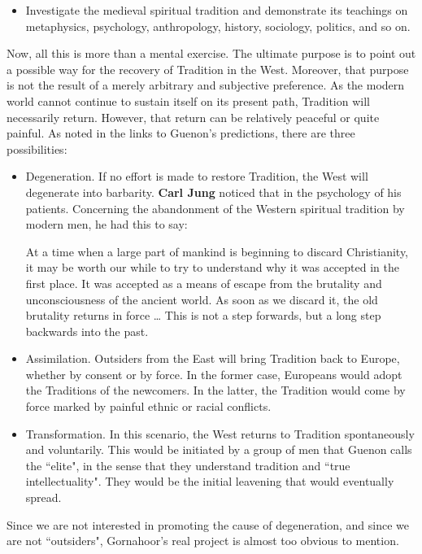 \begin{itemize}
\item Investigate the medieval spiritual tradition and demonstrate its teachings on metaphysics, psychology, anthropology, history, sociology, politics, and so on. 
\end{itemize}
Now, all this is more than a mental exercise. The ultimate purpose is to point out a possible way for the recovery of Tradition in the West. Moreover, that purpose is not the result of a merely arbitrary and subjective preference. As the modern world cannot continue to sustain itself on its present path, Tradition will necessarily return. However, that return can be relatively peaceful or quite painful. As noted in the links to Guenon's predictions, there are three possibilities:

\begin{itemize}
\item Degeneration. If no effort is made to restore Tradition, the West will degenerate into barbarity. \textbf{Carl Jung} noticed that in the psychology of his patients. Concerning the abandonment of the Western spiritual tradition by modern men, he had this to say:

\begin{quotex}
At a time when a large part of mankind is beginning to discard Christianity, it may be worth our while to try to understand why it was accepted in the first place. It was accepted as a means of escape from the brutality and unconsciousness of the ancient world. As soon as we discard it, the old brutality returns in force … This is not a step forwards, but a long step backwards into the past.
\end{quotex}
\item Assimilation. Outsiders from the East will bring Tradition back to Europe, whether by consent or by force. In the former case, Europeans would adopt the Traditions of the newcomers. In the latter, the Tradition would come by force marked by painful ethnic or racial conflicts. 
\item Transformation. In this scenario, the West returns to Tradition spontaneously and voluntarily. This would be initiated by a group of men that Guenon calls the ``elite", in the sense that they understand tradition and ``true intellectuality". They would be the initial leavening that would eventually spread. 
\end{itemize}
Since we are not interested in promoting the cause of degeneration, and since we are not ``outsiders", Gornahoor's real project is almost too obvious to mention.

